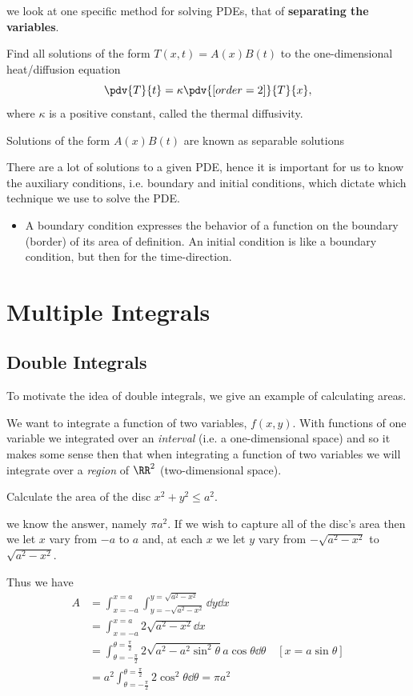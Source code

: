 we look at one specific method for solving PDEs, that of \textbf{separating the variables}.

\begin{exercise}
Find all solutions of the form $T(x,t)=A(x)B(t)$ to the one-dimensional heat/diffusion equation
\[ \pdv{T}{t}=\kappa\pdv{[order={2}]}{T}{x}, \]
where $\kappa$ is a positive constant, called the thermal diffusivity.
\end{exercise}

Solutions of the form $A(x)B(t)$ are known as separable solutions

There are a lot of solutions to a given PDE, hence it is important for us to know the auxiliary conditions, i.e. boundary and initial conditions, which dictate which technique we use to solve the PDE.
\begin{itemize}
\item A boundary condition expresses the behavior of a function on the boundary (border) of its area of definition. An initial condition is like a boundary condition, but then for the time-direction.
\end{itemize}
\pagebreak

\chapter{Multiple Integrals}
\section{Double Integrals}
To motivate the idea of double integrals, we give an example of calculating areas.

We want to integrate a function of two variables, $f(x,y)$. With functions of one variable we integrated over an \emph{interval} (i.e. a one-dimensional space) and so it makes some sense then that when integrating a function of two variables we will integrate over a \emph{region} of $\RR^2$ (two-dimensional space). 

\begin{exercise}
Calculate the area of the disc $x^2+y^2\le a^2$.
\end{exercise}

\begin{solution}
we know the answer, namely $\pi a^2$. If we wish to capture all of the disc's area then we let $x$ vary from $-a$ to $a$ and, at each $x$ we let $y$ vary from $-\sqrt{a^2-x^2}$ to $\sqrt{a^2-x^2}$.

Thus we have
\begin{align*}
A &= \int_{x=-a}^{x=a}\int_{y=-\sqrt{a^2-x^2}}^{y=\sqrt{a^2-x^2}}\dd{y}\dd{x} \\
&= \int_{x=-a}^{x=a}2\sqrt{a^2-x^2}\dd{x} \\
&= \int_{\theta=-\frac{\pi}{2}}^{\theta=\frac{\pi}{2}}2\sqrt{a^2-a^2\sin^2\theta}a\cos\theta\dd{\theta} \quad [x=a\sin\theta] \\
&= a^2\int_{\theta=-\frac{\pi}{2}}^{\theta=\frac{\pi}{2}}2\cos^2\theta\dd{\theta}=\pi a^2
\end{align*}
\end{solution}

